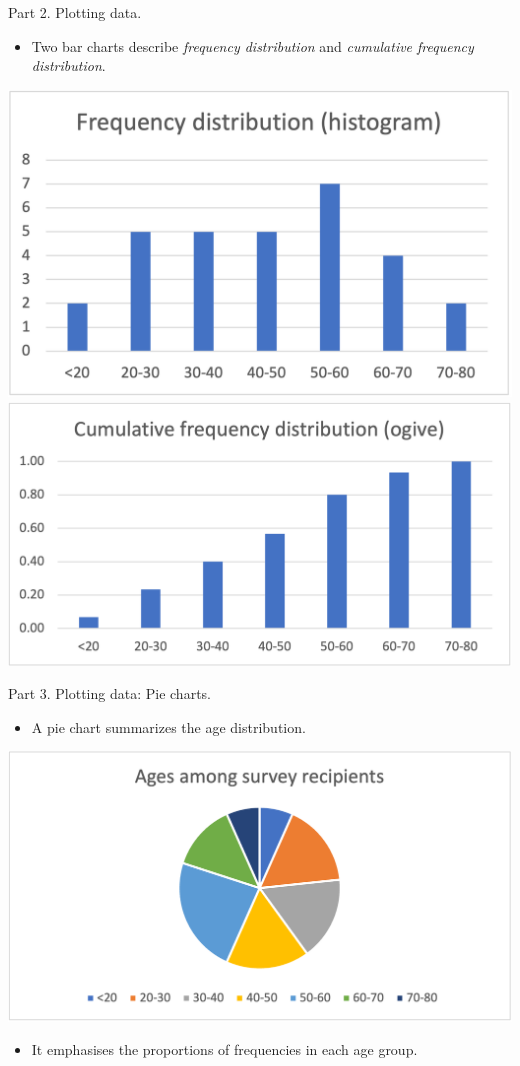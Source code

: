 \documentclass[
  10pt,
  ignorenonframetext,
]{beamer}
\providecommand{\tightlist}{%
  \setlength{\itemsep}{0pt}\setlength{\parskip}{0pt}}
\begin{document}
\begin{frame}{Part 2. Plotting data.}
\protect\hypertarget{part-2.-plotting-data.-1}{}
\begin{itemize}
\tightlist
\item
  Two bar charts describe \emph{frequency distribution} and
  \emph{cumulative frequency distribution}.
\end{itemize}

\begin{center}\includegraphics[width=0.45\linewidth,height=0.3\textheight]{pictures/Ex1-pmf-Histogram} \includegraphics[width=0.45\linewidth,height=0.3\textheight]{pictures/Ex1-cdf-Ogive} \end{center}
\end{frame}

\begin{frame}{Part 3. Plotting data: Pie charts.}
\protect\hypertarget{part-3.-plotting-data-pie-charts.}{}
\begin{itemize}
\tightlist
\item
  A pie chart summarizes the age distribution.
\end{itemize}

\begin{center}\includegraphics[width=0.6\linewidth]{pictures/Ex1-PieChart} \end{center}

\begin{itemize}
\tightlist
\item
  It emphasises the proportions of frequencies in each age group.
\end{itemize}
\end{frame}
\end{document}
